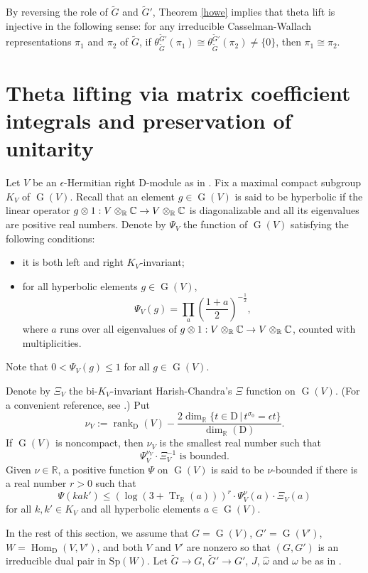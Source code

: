 \documentclass[lang = american]{ems-icm} %
\newcommand{\R}{\mathbb R}
\def\Sp{{\mathrm{Sp}}}
\newcommand{\Hom}{\operatorname{Hom}}
\newcommand{\Tr}{\operatorname{Tr}}
\newcommand{\rank}{\operatorname{rank}}
\newcommand{\rD}{\mathrm D}
\newcommand{\oG}{\operatorname{G}}
\numberwithin{equation}{section}
\theoremstyle{remark}
\begin{document}
By reversing the role of $\widetilde G$ and $\widetilde G'$, Theorem \ref{howe} implies that theta lift is injective in the following sense: for any irreducible Casselman-Wallach representations $\pi_1$ and $\pi_2$  of $\widetilde G$, if $\theta_{\widetilde G}^{\widetilde G'}(\pi_1)\cong \theta_{\widetilde G}^{\widetilde G'}(\pi_2)\neq \{0\}$, then $\pi_1\cong \pi_2$.


\section{Theta lifting via matrix coefficient integrals and preservation of unitarity}\label{sec2}


Let $V$ be an $\epsilon$-Hermitian right $\rD$-module as in . Fix a maximal compact subgroup $K_V$ of $\oG(V)$. Recall that an element $g\in \oG(V)$ is said to be hyperbolic if the linear operator $g\otimes 1: V\otimes_\R \C\rightarrow V\otimes_\R \C$ is diagonalizable and all its eigenvalues are positive real numbers.
Denote by  $\Psi_V$ the function of $\oG(V)$ satisfying the following conditions:
\begin{itemize}
\item it is both left and right $K_V$-invariant;
\item for all hyperbolic elements $g\in \oG(V)$,
\[
  \Psi_V(g)=\prod_{a} \left(\frac{1+a}{2}\right)^{-\frac{1}{2}},
\]
 where $a$ runs over all eigenvalues of $g\otimes 1: V\otimes_\R \C\rightarrow V\otimes_\R \C$, counted with multiplicities.
\end{itemize}
Note that  $0<\Psi_V(g)\leq 1$ for all $g\in \oG(V)$.

Denote by $\Xi_V$ the bi-$K_V$-invariant Harish-Chandra's $\Xi$ function on $\oG(V)$. (For a convenient reference, see \cite{Wa1}.)
Put
\[
  \nu_{V}:=\rank_\rD(V)-\frac{2\dim_{\R}\{t\in \rD\,|\,t^{\sigma_0}=\epsilon t\}}{\dim_{\R}(\rD)}.
  \]
If $\oG(V)$ is noncompact, then $\nu_V$ is the smallest real number such that
\[
\Psi_V^{\nu_V}\cdot \Xi_V^{-1}\textrm{ is bounded}.
\]
Given $\nu\in \R$, a  positive function $\Psi$ on $\oG(V)$ is said to be $\nu$-bounded if there is a real number $r>0$  such that
\[
  \Psi(kak')\leq (\log(3+\Tr_{\R}(a)))^r \cdot \Psi_{V}^\nu(a)\cdot \Xi_V(a)
  \]
  for all $k,k'\in K_V$ and all hyperbolic elements $a\in \oG(V)$.


In the rest of this section, we assume that $G=\oG(V)$, $G'=\oG(V')$, $W=\Hom_{\rD}(V,V')$, and both $V$ and $V'$ are nonzero so that $(G,G')$ is an irreducible dual pair in $\Sp(W)$.
Let $\widetilde G\rightarrow G$, $\widetilde G'\rightarrow G'$, $J$, $\widehat \omega$ and $\omega$ be as in .
\end{document}
